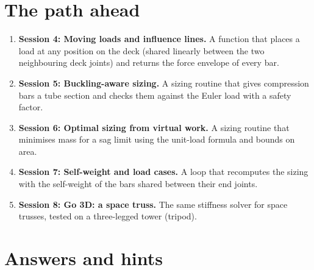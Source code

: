 \documentclass[11pt,a4paper]{article}
\begin{document}
\section{The path ahead}
\begin{enumerate}[nosep]
\item \textbf{Session 4: Moving loads and influence lines.} A function that places a load at any position on the deck (shared linearly between the two neighbouring deck joints) and returns the force envelope of every bar.
\item \textbf{Session 5: Buckling-aware sizing.} A sizing routine that gives compression bars a tube section and checks them against the Euler load with a safety factor.
\item \textbf{Session 6: Optimal sizing from virtual work.} A sizing routine that minimises mass for a sag limit using the unit-load formula and bounds on area.
\item \textbf{Session 7: Self-weight and load cases.} A loop that recomputes the sizing with the self-weight of the bars shared between their end joints.
\item \textbf{Session 8: Go 3D: a space truss.} The same stiffness solver for space trusses, tested on a three-legged tower (tripod).
\end{enumerate}

\section{Answers and hints}
\end{document}
